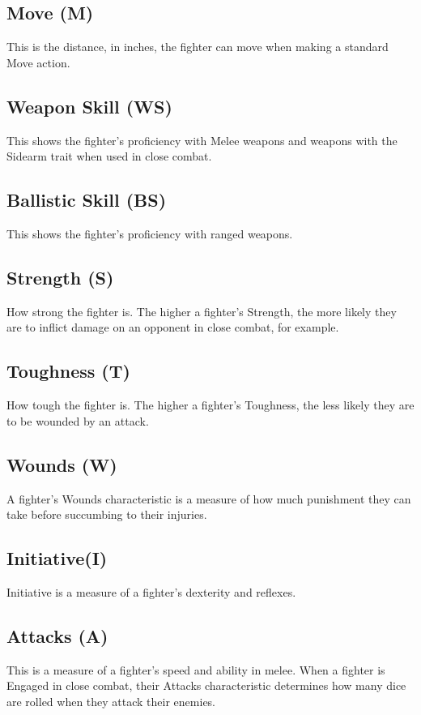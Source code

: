 \begin{multicols}{2}

\subsection{Move (M)}
This is the distance, in inches, the fighter can move when
making a standard Move action.

\subsection{Weapon Skill (WS)}
This shows the fighter’s proficiency with Melee weapons
and weapons with the Sidearm trait when used in close
combat.

\subsection{Ballistic Skill (BS)}
This shows the fighter’s proficiency with ranged weapons.

\subsection{Strength (S)}
How strong the fighter is. The higher a fighter’s Strength,
the more likely they are to inflict damage on an opponent
in close combat, for example.

\subsection{Toughness (T)}
How tough the fighter is. The higher a fighter’s
Toughness, the less likely they are to be wounded by an
attack.

\subsection{Wounds (W)}
A fighter’s Wounds characteristic is a measure of how
much punishment they can take before succumbing to
their injuries.

\subsection{Initiative(I)}
Initiative is a measure of a fighter’s dexterity and reflexes.

\subsection{Attacks (A)}
This is a measure of a fighter’s speed and ability in melee.
When a fighter is Engaged in close combat, their Attacks
characteristic determines how many dice are rolled when
they attack their enemies.


\end{multicols}
